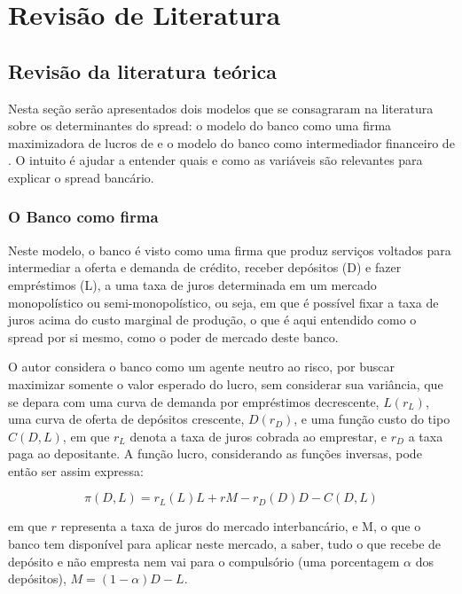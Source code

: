 \documentclass[a4paper,
               article,
               12pt,
               openany,
               oneside,
               english,
               brazil]{abntex2}
\numberwithin{equation}{section}
\begin{document}
\section{Revisão de Literatura}
\subsection{Revisão da literatura teórica}

    Nesta seção serão apresentados dois modelos que se consagraram na literatura sobre os determinantes do spread: o modelo do banco como uma firma maximizadora de lucros de \textcite{klein} e o modelo do banco como intermediador financeiro de \textcite{hoesaunders}. O intuito é ajudar a entender quais e como as variáveis são relevantes para explicar o spread bancário.

\subsubsection{O Banco como firma}

    Neste modelo, o banco é visto como uma firma que produz serviços voltados para intermediar a oferta e demanda de crédito, receber depósitos (D) e fazer empréstimos (L), a uma taxa de juros determinada em um mercado monopolístico ou semi-monopolístico, ou seja, em que é possível fixar a taxa de juros acima do custo marginal de produção, o que é aqui entendido como o spread por si mesmo, como o poder de mercado deste banco. \cite{oreiro}

    O autor considera o banco como um agente neutro ao risco, por buscar maximizar somente o valor esperado do lucro, sem considerar sua variância, que se depara com uma curva de demanda por empréstimos decrescente, $ L(r_L) $, uma curva de oferta de depósitos crescente, $ D(r_D) $, e uma função custo do tipo $ C(D, L) $, em que $ r_L $ denota a taxa de juros cobrada ao emprestar, e $ r_D $ a taxa paga ao depositante. A função lucro, considerando as funções inversas, pode então ser assim expressa: 
    
    \begin{equation} \pi(D, L) = r_L(L)L + rM - r_D(D)D - C(D, L) \end{equation}
        
    em que $ r $ representa a taxa de juros do mercado interbancário, e M, o que o banco tem disponível para aplicar neste mercado, a saber, tudo o que recebe de depósito e não empresta nem vai para o compulsório (uma porcentagem $\alpha$ dos depósitos), $M = (1 - \alpha)D - L$. 
\end{document}
